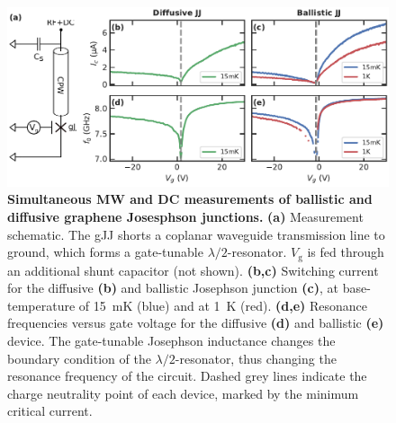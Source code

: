 \begin{figure}[t]
	\centering
	\includegraphics[width=\linewidth]{chapter-gJJ-CPR/figs/Figure1}
	\caption{
		\textbf{Simultaneous MW and DC measurements of ballistic and diffusive graphene Josesphson junctions.}
		\textbf{(a)} Measurement schematic.
		The gJJ shorts a coplanar waveguide transmission line to ground, which forms a gate-tunable $\lambda/2$-resonator.
		$V_\text{g}$ is fed through an additional shunt capacitor (not shown).
		\textbf{(b,c)} Switching current for the diffusive \textbf{(b)} and ballistic Josephson junction \textbf{(c)}, at base-temperature of \SI{15}{\milli\kelvin} (blue) and at \SI{1}{\kelvin} (red).
		\textbf{(d,e)} Resonance frequencies versus gate voltage for the diffusive \textbf{(d)} and ballistic \textbf{(e)} device.
		The gate-tunable Josephson inductance changes the boundary condition of the $\lambda/2$-resonator, thus changing the resonance frequency of the circuit.
		Dashed grey lines indicate the charge neutrality point of each device, marked by the minimum critical current.
	}
	\label{CPRfig:figure1}
\end{figure}

